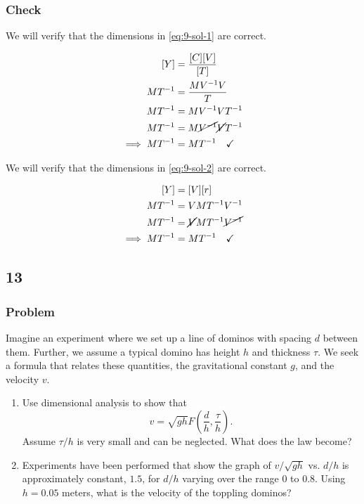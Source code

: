 \documentclass[12pt]{article}
\begin{document}
  \subsubsection*{Check}
  We will verify that the dimensions in \cref{eq:9-sol-1} are correct.

  \begin{equation}
    \begin{aligned}
      [Y] &= \frac{[C][V]}{[T]} \\
      MT^{-1} &= \frac{MV^{-1}V}{T} \\
      MT^{-1} &= MV^{-1}VT^{-1} \\
      MT^{-1} &= M\cancel{V^{-1}}\cancel{V}T^{-1} \\
      \implies MT^{-1} &= MT^{-1} \quad\checkmark \\
    \end{aligned}
  \end{equation}

  We will verify that the dimensions in \cref{eq:9-sol-2} are correct.

  \begin{equation}
    \begin{aligned}
      [Y] &= [V] [r] \\
      MT^{-1} &= V MT^{-1}V^{-1} \\
      MT^{-1} &= \cancel{V} MT^{-1} \cancel{V^{-1}} \\
      \implies MT^{-1} &= MT^{-1} \quad\checkmark \\
    \end{aligned}
  \end{equation}

  \subsection{13}
  \subsubsection*{Problem}
  Imagine an experiment where we set up a line of dominos with spacing $d$
  between them. Further, we assume a typical domino has height $h$ and thickness
  $\tau$. We seek a formula that relates these quantities, the gravitational
  constant $g$, and the velocity $v$.

  \begin{enumerate}
  \item Use dimensional analysis to show
    that $$v=\sqrt{gh}F\left(\frac{d}{h},\frac{\tau}{h}\right).$$
    Assume $\tau/h$ is very small and can be neglected. What does the law become?
  \item Experiments have been performed that show the graph of $v/\sqrt{gh}$ vs.
    $d/h$ is approximately constant, $1.5$, for $d/h$ varying over the range $0$
    to $0.8$. Using $h=0.05$ meters, what is the velocity of the toppling dominos?
  \end{enumerate}
\end{document}
